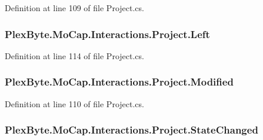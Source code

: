 Definition at line 109 of file Project.\+cs.

\subsubsection[{\texorpdfstring{Left}{Left}}]{ Plex\+Byte.\+Mo\+Cap.\+Interactions.\+Project.\+Left}\hypertarget{class_plex_byte_1_1_mo_cap_1_1_interactions_1_1_project_a385ca7e4f05b1dba7c270ed935fe73d3}{}\label{class_plex_byte_1_1_mo_cap_1_1_interactions_1_1_project_a385ca7e4f05b1dba7c270ed935fe73d3}


Definition at line 114 of file Project.\+cs.

\subsubsection[{\texorpdfstring{Modified}{Modified}}]{ Plex\+Byte.\+Mo\+Cap.\+Interactions.\+Project.\+Modified}\hypertarget{class_plex_byte_1_1_mo_cap_1_1_interactions_1_1_project_a437ba816061b8662712a82580618e4c7}{}\label{class_plex_byte_1_1_mo_cap_1_1_interactions_1_1_project_a437ba816061b8662712a82580618e4c7}


Definition at line 110 of file Project.\+cs.

\subsubsection[{\texorpdfstring{State\+Changed}{StateChanged}}]{ Plex\+Byte.\+Mo\+Cap.\+Interactions.\+Project.\+State\+Changed}\hypertarget{class_plex_byte_1_1_mo_cap_1_1_interactions_1_1_project_a79227b0122133a9c437832f7fc24b3d4}{}\label{class_plex_byte_1_1_mo_cap_1_1_interactions_1_1_project_a79227b0122133a9c437832f7fc24b3d4}


